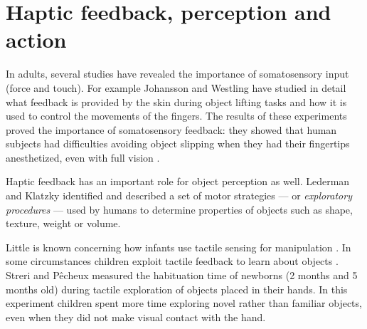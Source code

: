 \section{Haptic feedback, perception and action}
\label{sec:background}

In adults, several studies have revealed the importance of
somatosensory input (force and touch). For example Johansson and Westling
\cite{Johansson90Tactile} have studied in detail what feedback
is provided by the skin during object lifting tasks and how it is
used to control the movements of the fingers. The results of these
experiments proved the importance of somatosensory feedback: they
showed that human subjects had difficulties avoiding object slipping when
they had their fingertips anesthetized, even with full vision
\cite{johansson91how}. 

Haptic feedback has an important role for
object perception as well. Lederman and Klatzky \cite{klatzky87Hand}
identified and described a set of motor strategies --- or 
\emph{exploratory procedures} --- used by humans to determine 
properties of objects such as shape, texture, weight or volume.

Little is known concerning how infants use 
tactile sensing for manipulation \cite{streri93Seeing}.
In some circumstances children exploit tactile feedback to learn
about objects \cite{streri86Habituation}. Streri and P\^{e}cheux
measured the habituation time of newborns (2 months and 5 months
old) during tactile exploration of objects placed in their hands.
In this experiment children spent more time exploring novel rather
than familiar objects, even when they did not make visual contact
with the hand. %

